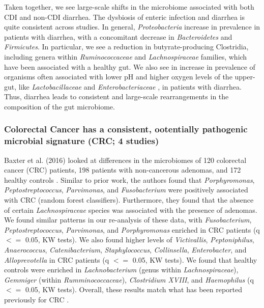 Taken together, we see large-scale shifts in the microbiome associated with both CDI and non-CDI diarrhea.
The dysbiosis of enteric infection and diarrhea is quite consistent across studies.
In general, \textit{Proteobacteria} increase in prevalence in patients with diarrhea, with a concomitant decrease in \textit{Bacteroidetes} and \textit{Firmicutes}.
In particular, we see a reduction in butyrate-producing Clostridia, including genera within \textit{Ruminococcaceae} and \textit{Lachnospiraceae} families, which have been associated with a healthy gut.
We also see in increase in prevalence of organisms often associated with lower pH and higher oxygen levels of the upper-gut, like \textit{Lactobacillaceae} and \textit{Enterobacteriaceae} \cite{donaldson2016gut}, in patients with diarrhea.
Thus, diarrhea leads to consistent and large-scale rearrangements in the composition of the gut microbiome.

\subsubsection{Colorectal Cancer has a consistent, ootentially pathogenic microbial signature (CRC; 4 studies)}

Baxter et al. (2016) looked at differences in the microbiomes of 120 colorectal cancer (CRC) patients, 198 patients with non-cancerous adenomas, and 172 healthy controls \cite{crc-baxter}.
Similar to prior work, the authors found that \textit{Porphyromonas}, \textit{Peptostreptococcus}, \textit{Parvimonas}, and \textit{Fusobacterium} were positively associated with CRC (random forest classifiers).
Furthermore, they found that the absence of certain \textit{Lachnospiraceae} species was associated with the presence of adenomas.
We found similar patterns in our re-analysis of these data, with \textit{Fusobacterium}, \textit{Peptostreptococcus}, \textit{Parvimonas}, and \textit{Porphyromonas} enriched in CRC patients (q $<=$ 0.05, KW tests).
We also found higher levels of \textit{Victivallis}, \textit{Peptoniphilus}, \textit{Anaerococcus}, \textit{Catenibacterium}, \textit{Staphylococcus}, \textit{Collinsella}, \textit{Enterobacter}, and \textit{Alloprevotella} in CRC patients (q $<=$ 0.05, KW tests).
We found that healthy controls were enriched in \textit{Lachnobacterium} (genus within \textit{Lachnospiraceae}), \textit{Gemmiger} (within \textit{Rumminococcaceae}), \textit{Clostridium XVIII}, and \textit{Haemophilus} (q $<=$ 0.05, KW tests).
Overall, these results match what has been reported previously for CRC \cite{brennan2016gut}.

